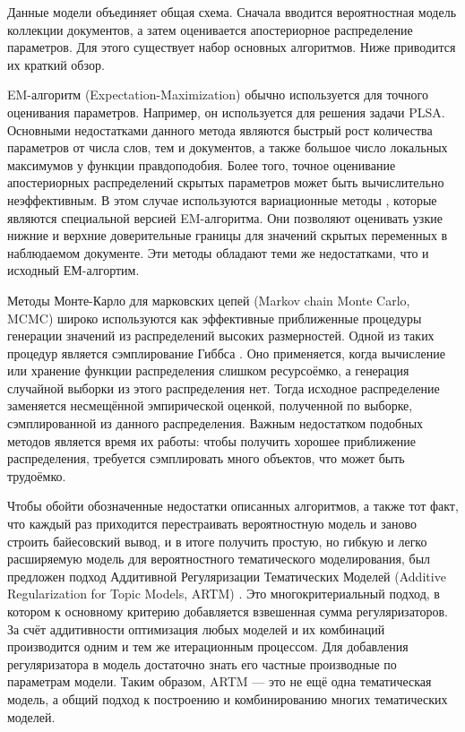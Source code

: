 \documentclass[12pt, twoside]{article}
\begin{document}
Данные модели объединяет общая схема. Сначала вводится вероятностная модель коллекции документов, а затем оценивается  апостериорное распределение  параметров. Для этого существует набор основных алгоритмов. Ниже приводится их краткий обзор.

EM-алгоритм (Expectation-Maximization) \cite{baseem} обычно используется для  точного оценивания параметров. Например, он используется для решения задачи PLSA. Основными недостатками данного метода являются быстрый рост количества параметров от числа слов, тем и документов, а также большое число локальных максимумов у функции правдоподобия. Более того, точное оценивание апостериорных распределений скрытых параметров может быть вычислительно неэффективным. В этом случае используются вариационные методы \cite{basevar}, которые являются специальной версией EM-алгоритма. Они  позволяют оценивать узкие нижние и верхние доверительные границы для значений скрытых переменных в наблюдаемом документе. Эти методы обладают теми же недостатками, что и исходный ЕМ-алгортим.

Методы Монте-Карло для марковских цепей (Markov chain Monte Carlo, MCMC) \cite{mcmc1, mcmc2} широко используются как эффективные приближенные процедуры генерации значений из распределений высоких размерностей. Одной из таких процедур является сэмплирование Гиббса \cite{gibbs}.  Оно применяется, когда вычисление или хранение функции распределения слишком ресурсоёмко, а генерация случайной выборки из этого распределения нет. Тогда исходное распределение заменяется несмещённой эмпирической оценкой, полученной по выборке, сэмплированной из данного распределения. Важным недостатком подобных методов является время их работы: чтобы получить хорошее приближение распределения, требуется сэмплировать много объектов, что может быть трудоёмко. 

Чтобы обойти обозначенные недостатки описанных алгоритмов, а также тот факт, что каждый раз приходится перестраивать вероятностную модель и заново строить байесовский вывод, и в итоге получить простую, но гибкую и легко расширяемую модель для вероятностного тематического моделирования, был предложен подход Аддитивной Регуляризации Тематических Моделей (Additive Regularization for Topic Models, ARTM) \cite{artmdef1, artmdef2, artmdef3}. Это многокритериальный подход, в котором к основному критерию добавляется взвешенная сумма регуляризаторов.  За счёт аддитивности оптимизация любых моделей и их комбинаций производится одним и тем же итерационным процессом. Для добавления регуляризатора в модель достаточно знать его частные производные по параметрам модели. Таким образом, ARTM ---  это не ещё одна тематическая модель, а общий подход к построению и комбинированию многих тематических моделей. 
\end{document}
